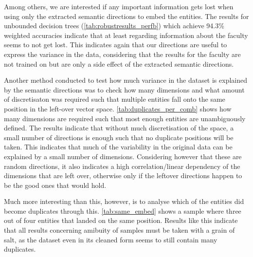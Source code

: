 Among others, we are interested if any important information gets lost when using only the extracted semantic directions to embed the entities. The results for unbounded decision trees (\autoref{tab:robustresults_perfb}) which achieve 94.3\% weighted accuracies indicate that at least regarding information about the faculty seems to not get lost. This indicates again that our directions are useful to express the variance in the data, considering that the results for the faculty are not trained on but are only a side effect of the extracted semantic directions. 

Another method conducted to test how much variance in the dataset is explained by the semantic directions was to check how many dimensions and what amount of discretisaton was required such that multiple entities fall onto the same position in the left-over vector space. \autoref{tab:duplicates_per_comb} shows how many dimensions are required such that most enough entities are unambiguously defined. The results indicate that without much discretisation of the space, a small number of directions is enough such that no duplicate positions will be taken. This indicates that much of the variability in the original data can be explained by a small number of dimensions. Considering however that these are random directions, it also indicates a high correlation/linear dependency of the dimensions that are left over, otherwise only if the leftover directions happen to be the good ones that would hold.

Much more interesting than this, however, is to analyse which of the entities did become duplicates through this. \autoref{tab:same_embed} shows a sample where three out of four entities that landed on the same position. Results like this indicate that all results concerning amibuity of samples must be taken with a grain of salt, as the dataset even in its cleaned form seems to still contain many duplicates.

\begin{table}[h]
    \centering
    \caption{Sample courses falling onto the same embedding after discretisation}
    \label{tab:same_embed}
\end{table}

